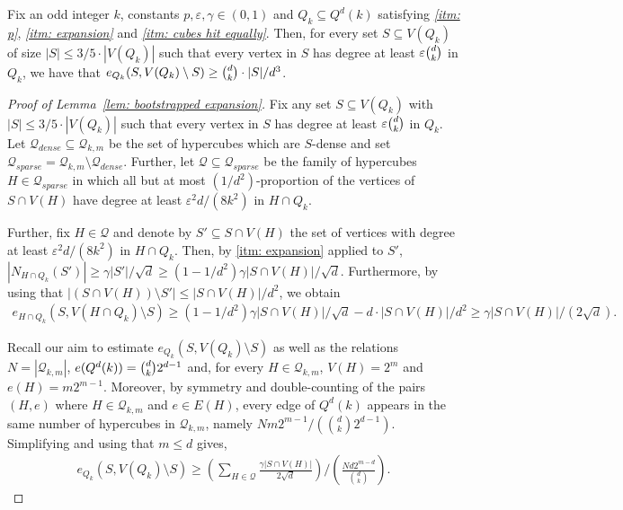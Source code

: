 \documentclass[10pt,a4paper]{amsart}
\newcommand{\cQ}{\mathcal{Q}}
\newcommand{\eps}{\varepsilon}
\begin{document}
\begin{lemma}\label{lem: bootstrapped expansion}
Fix an odd integer $k$, constants $p,\varepsilon,\gamma\in(0,1)$ and $Q_k\subseteq Q^d(k)$ satisfying \emph{\ref{itm: p}}, \emph{\ref{itm: expansion}} and \emph{\ref{itm: cubes hit equally}}. Then, for every set $S\subseteq V(Q_k)$ of size $|S|\leq 3/5\cdot|V(Q_k)|$ such that every vertex in $S$ has degree at least $\varepsilon \tbinom{d}{k}$ in $Q_k$, we have that $e_{Q_k}(S,V(Q_k)\setminus S)\geq \tbinom{d}{k}\cdot|S|/d^3$.
\end{lemma}

\begin{proof}[Proof of Lemma~\ref{lem: bootstrapped expansion}]
Fix any set $S\subseteq V(Q_k)$ with $|S|\leq 3/5\cdot |V(Q_k)|$ such that every vertex in $S$ has degree at least $\varepsilon \tbinom{d}{k}$ in $Q_k$. Let $\cQ_{dense}\subseteq\cQ_{k,m}$ be the set of hypercubes which are $S$-dense and set $\cQ_{sparse} = \cQ_{k,m}\setminus\cQ_{dense}$. 
Further, let $\cQ\subseteq \cQ_{sparse}$ be the family of hypercubes $H\in \cQ_{sparse}$ in which all but at most $(1/d^2)$-proportion of the vertices of $S\cap V(H)$ have degree at least $\eps^2d/(8k^2)$ in $H\cap Q_k$.

Further, fix $H\in \cQ$ and denote by $S'\subseteq S\cap V(H)$ the set of vertices with degree at least $\eps^2d/(8k^2)$ in $H\cap Q_k$. 
Then, by \ref{itm: expansion} applied to $S'$, $|N_{H\cap Q_k}(S')|\ge \gamma |S'|/\sqrt{d}\ge (1-1/d^2)\gamma |S\cap V(H)|/\sqrt d$. Furthermore, by using that $|(S\cap V(H))\setminus S'|\le |S\cap V(H)|/d^2$, we obtain
\begin{align*}
  e_{H\cap Q_k}(S,V(H\cap Q_k)\setminus S)
  \geq (1-1/d^2)\gamma|S\cap V(H)|/\sqrt d-d\cdot |S\cap V(H)|/d^2\geq \gamma|S\cap V(H)|/(2\sqrt d).  
\end{align*} 

Recall our aim to estimate $e_{Q_k}(S, V(Q_k)\setminus S)$ as well as the relations $N=|\cQ_{k,m}|$, $e(Q^d(k)) = \tbinom{d}{k} 2^{d-1}$ and, for every $H\in \cQ_{k,m}$, $V(H)=2^m$ and $e(H)=m2^{m-1}$.
Moreover, by symmetry and double-counting of the pairs $(H,e)$ where $H\in \cQ_{k,m}$ and $e\in E(H)$, every edge of $Q^d(k)$ appears in the same number of hypercubes in $\cQ_{k,m}$, namely $Nm2^{m-1}/(\binom{d}{k}2^{d-1})$. Simplifying and using that $m\le d$ gives,
\begin{align}\label{eq: edges leaving S}
    e_{Q_k}(S,V(Q_k)\setminus S)\geq \left(\sum_{H\in \cQ}\frac{\gamma|S\cap V(H)|}{2\sqrt d}\right)\bigg/\left(\frac{N d 2^{m-d}}{\binom{d}{k}}\right).
\end{align}


\end{proof}
\end{document}
